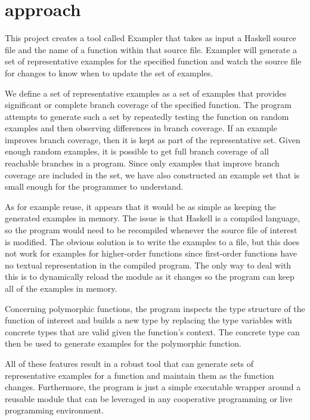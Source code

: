 \section{approach}

This project creates a tool called Exampler that takes as input a Haskell source file and the name of a function within that source file.
Exampler will generate a set of representative examples for the specified function and watch the source file for changes to know when to update the set of examples.
	
We define a set of representative examples as a set of examples that provides significant or complete branch coverage of the specified function.
The program attempts to generate such a set by repeatedly testing the function on random examples and then observing differences in branch coverage.
If an example improves branch coverage, then it is kept as part of the representative set.
Given enough random examples, it is possible to get full branch coverage of all reachable branches in a program.
Since only examples that improve branch coverage are included in the set, we have also constructed an example set that is small enough for the programmer to understand.

As for example reuse, it appears that it would be as simple as keeping the generated examples in memory.
The issue is that Haskell is a compiled language, so the program would need to be recompiled whenever the source file of interest is modified.
The obvious solution is to write the examples to a file, but this does not work for examples for higher-order functions since first-order functions have no textual representation in the compiled program.
The only way to deal with this is to dynamically reload the module as it changes so the program can keep all of the examples in memory.

Concerning polymorphic functions, the program inspects the type structure of the function of interest and builds a new type by replacing the type variables with concrete types that are valid given the function's context.
The concrete type can then be used to generate examples for the polymorphic function.

All of these features result in a robust tool that can generate sets of representative examples for a function and maintain them as the function changes.
Furthermore, the program is just a simple executable wrapper around a reusable module that can be leveraged in any cooperative programming or live programming environment.

